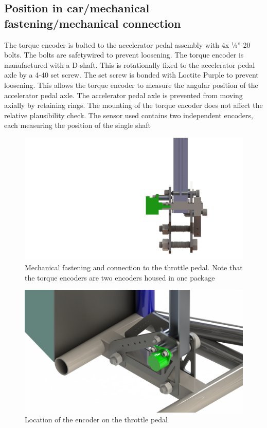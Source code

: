 \documentclass{article}
\begin{document}
\subsection{Position in car/mechanical fastening/mechanical connection}
The torque encoder is bolted to the accelerator pedal assembly with 4x ¼”-20 bolts. The bolts are safetywired to prevent loosening. The torque encoder is manufactured with a D-shaft. This is rotationally fixed to the accelerator pedal axle by a 4-40 set screw. The set screw is bonded with Loctite Purple to prevent loosening. This allows the torque encoder to measure the angular position of the accelerator pedal axle. The accelerator pedal axle is prevented from moving axially by retaining rings. The mounting of the torque encoder does not affect the relative plausibility check. The sensor used contains two independent encoders, each measuring the position of the single shaft 

\begin{figure}[H]
    \centering
    \includegraphics[width=\linewidth]{encoder_connection.png}
    \caption{Mechanical fastening and connection to the throttle pedal. Note that the torque encoders are two encoders housed in one package}
    \label{fig:encoder_position}
\end{figure}

\begin{figure}[H]
    \centering
    \includegraphics[width=\linewidth]{encoder_mount}
    \caption{Location of the encoder on the throttle pedal}
    \label{fig:encoder_mount}
\end{figure}
\end{document}
